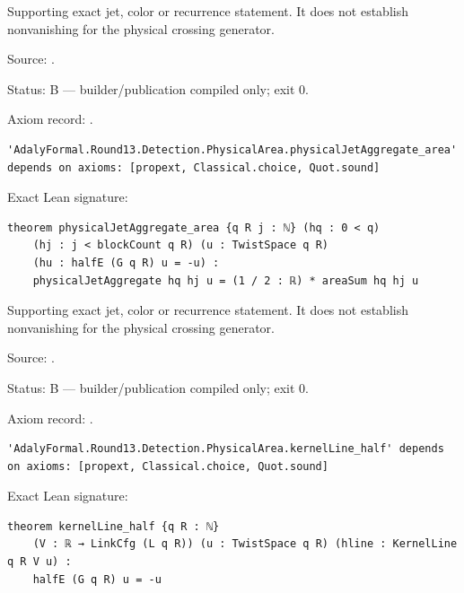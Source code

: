 \begin{theorem}[bp-544]
\label{bp-544}
\leanok
Supporting exact jet, color or recurrence statement. It does not establish nonvanishing for the physical crossing generator.

\par Source: \texttt{}.
\par Status: B — builder/publication compiled only; exit 0.
\par Axiom record: \texttt{}.
\begin{verbatim}
'AdalyFormal.Round13.Detection.PhysicalArea.physicalJetAggregate_area' depends on axioms: [propext, Classical.choice, Quot.sound]
\end{verbatim}
\par Exact Lean signature:
\begin{verbatim}
theorem physicalJetAggregate_area {q R j : ℕ} (hq : 0 < q)
    (hj : j < blockCount q R) (u : TwistSpace q R)
    (hu : halfE (G q R) u = -u) :
    physicalJetAggregate hq hj u = (1 / 2 : ℝ) * areaSum hq hj u
\end{verbatim}
\end{theorem}

\begin{theorem}[bp-545]
\label{bp-545}
\uses{}
\leanok
Supporting exact jet, color or recurrence statement. It does not establish nonvanishing for the physical crossing generator.

\par Source: \texttt{}.
\par Status: B — builder/publication compiled only; exit 0.
\par Axiom record: \texttt{}.
\begin{verbatim}
'AdalyFormal.Round13.Detection.PhysicalArea.kernelLine_half' depends on axioms: [propext, Classical.choice, Quot.sound]
\end{verbatim}
\par Exact Lean signature:
\begin{verbatim}
theorem kernelLine_half {q R : ℕ}
    (V : ℝ → LinkCfg (L q R)) (u : TwistSpace q R) (hline : KernelLine q R V u) :
    halfE (G q R) u = -u
\end{verbatim}
\end{theorem}

